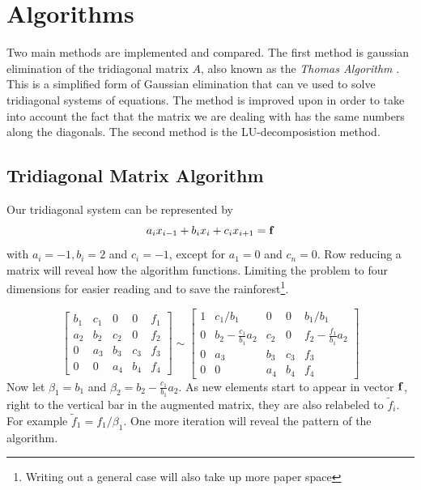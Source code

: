 \documentclass[10pt, a4paper]{amsart}
\begin{document}
\section{Algorithms}
Two main methods are implemented and compared. The first method is
gaussian elimination of the tridiagonal matrix $A$, also known as the
\emph{Thomas Algorithm} \cite{thomasalgo}. This is a simplified form of Gaussian
elimination that can ve used to solve tridiagonal systems of
equations. The method is improved upon in order to take into account
the fact that the matrix we are dealing with has the same numbers
along the diagonals. The second method is the LU-decomposistion
method.

\subsection{Tridiagonal Matrix Algorithm}
Our tridiagonal system can be represented by 
\begin{equation}
a_ix_{i-1} + b_ix_i + c_ix_{i+1} = \vb{f}
\end{equation}
with $a_i=-1,b_i=2$ and $c_i=-1$, except for $a_1=0$ and $c_n=0$. Row
reducing a matrix will reveal how the algorithm functions. Limiting
the problem to four dimensions for easier reading and to save the
rainforest\footnote{Writing out a general case will also take up more paper
space}.

\begin{equation}
\left[
\begin{array}{cccc|c}
b_1 & c_1 & 0 & 0 & f_1 \\
a_2 & b_2 & c_2 & 0  & f_2 \\
0 & a_3 & b_3 & c_3 & f_3 \\
0 & 0 & a_4 & b_4 & f_4
\end{array}
\right] \sim
\left[
\begin{array}{cccc|c}
1 & c_1/b_1 & 0 & 0 & b_1/b_1 \\
0 & b_2-\frac{c_1}{b_1}a_2 & c_2 & 0  & f_2-\frac{f_1}{b_1}a_2 \\
0 & a_3 & b_3 & c_3 & f_3 \\
0 & 0 & a_4 & b_4 & f_4
\end{array}
\right]
\end{equation}
Now let $\beta_1=b_1$ and $\beta_2=b_2-\frac{c_1}{b_1}a_2$. As new
elements start to appear in vector $\vb{f}$, right to the vertical bar
in the augmented matrix, they are also relabeled to $\tilde{f}_i$. For
example $\tilde{f}_1=f_1/\beta_1$. One more iteration will reveal the
pattern of the algorithm.
\end{document}
